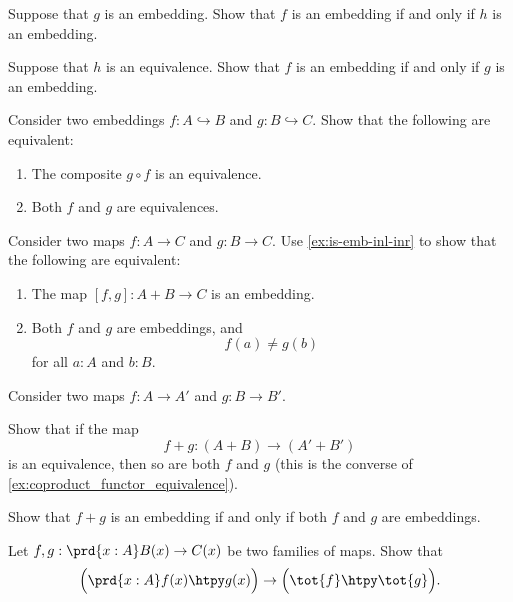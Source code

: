 \begin{exercises}
\begin{subexenum}
  \item Suppose that $g$ is an embedding. Show that $f$ is an embedding if and only if $h$ is an embedding.
  \item Suppose that $h$ is an equivalence. Show that $f$ is an embedding if and only if $g$ is an embedding.
  \end{subexenum}
  \exitem Consider two embeddings $f:A\hookrightarrow B$ and $g:B\hookrightarrow C$. Show that the following are equivalent:
  \begin{enumerate}
  \item The composite $g\circ f$ is an equivalence.
  \item Both $f$ and $g$ are equivalences.
  \end{enumerate}
  \exitem Consider two maps $f:A\to C$ and $g:B\to C$. Use \cref{ex:is-emb-inl-inr} to show that the following are equivalent:
  \begin{enumerate}
  \item The map $[f,g]:A+B\to C$ is an embedding.
  \item Both $f$ and $g$ are embeddings, and
    \begin{equation*}
      f(a)\neq g(b)
    \end{equation*}
    for all $a:A$ and $b:B$.
  \end{enumerate}
  \exitem \label{ex:is-equiv-is-equiv-functor-coprod}Consider two maps $f:A\to A'$ and $g:B \to B'$.
  \begin{subexenum}
  \item Show that if the map
    \begin{equation*}
      f+g:(A+B)\to (A'+B')
    \end{equation*}
    is an equivalence, then so are both $f$ and $g$ (this is the converse of \cref{ex:coproduct_functor_equivalence}).
  \item \label{ex:is-emb-coprod}Show that $f+g$ is an embedding if and only if both $f$ and $g$ are embeddings.
  \end{subexenum}
  \exitem \label{ex:id_fundamental_retr}
  \begin{subexenum}
  \item Let $f,g:\prd{x:A}B(x)\to C(x)$ be two families of maps. Show that
    \begin{equation*}
      \Big(\prd{x:A}f(x)\htpy g(x)\Big)\to \Big(\tot{f}\htpy \tot{g}\Big). 

\end{equation*}
\end{subexenum}
\end{exercises}
